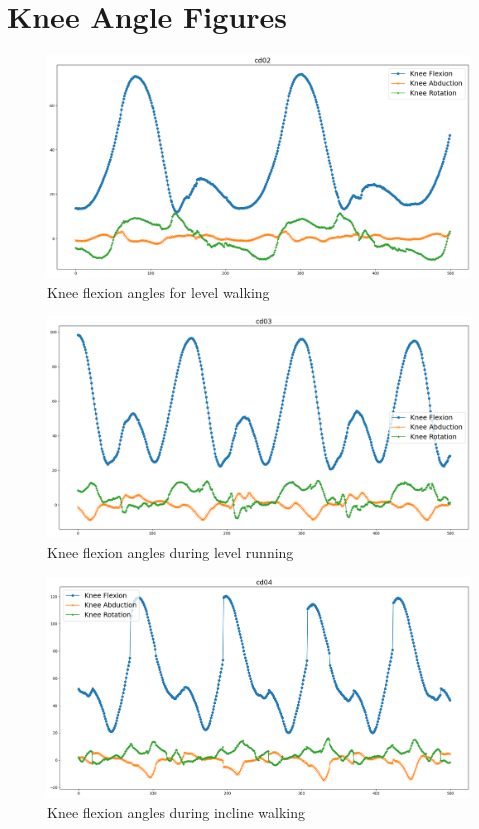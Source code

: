 \documentclass[10pt]{IEEEtran}
\begin{document}
    \section{Knee Angle Figures}
    \begin{figure}[ht]
        \includegraphics[width = \linewidth]{figs/cd02.png}
        \caption{Knee flexion angles for level walking}
    \end{figure}
    \begin{figure}[ht]
        \includegraphics[width = \linewidth]{figs/cd03.png}
        \caption{Knee flexion angles during level running}
    \end{figure}
    \begin{figure}[ht]
        \includegraphics[width = \linewidth]{figs/cd04.png}
        \caption{Knee flexion angles during incline walking}
    \end{figure}
\end{document}
